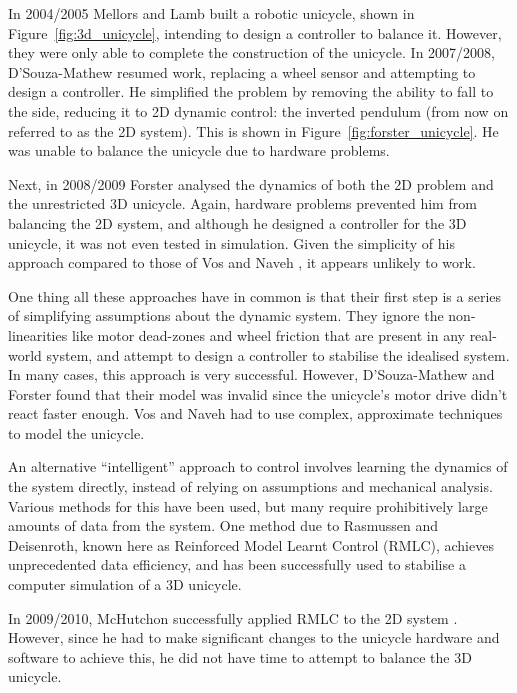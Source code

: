 \documentclass{IIBproject}
\begin{document}
In 2004/2005 Mellors and Lamb \cite{ref:mellors,ref:lamb} built a robotic
unicycle, shown in Figure~\ref{fig:3d_unicycle}, intending to design a controller to balance it. However, they were
only able to complete the construction of the unicycle. In 2007/2008,
D'Souza-Mathew resumed work, replacing a wheel sensor and attempting to design
a controller. He simplified the problem by removing the ability to fall to the
side, reducing it to 2D dynamic control: the inverted pendulum (from
now on referred to as the 2D system). This is shown in
Figure~\ref{fig:forster_unicycle}. He was unable to balance the unicycle due to
hardware problems.

Next, in 2008/2009 Forster analysed the dynamics of both the 2D problem and
the unrestricted 3D unicycle\cite{ref:forster}. Again, hardware problems
prevented him from balancing the 2D system, and although he designed a
controller for the 3D unicycle, it was not even tested in simulation. Given
the simplicity of his approach compared to those of Vos and Naveh
\cite{ref:vos,ref:naveh}, it appears unlikely to work.

One thing all these approaches have in common is that their first step is a
series of simplifying assumptions about the dynamic system. They ignore the
non-linearities like motor dead-zones and wheel friction that are present in
any real-world system, and attempt to design a controller to stabilise the
idealised system. In many cases, this approach is very successful. However,
D'Souza-Mathew and Forster found that their model was invalid since the
unicycle's motor drive didn't react faster enough. Vos and Naveh had to use
complex, approximate techniques to model the unicycle.

An alternative ``intelligent'' approach to control involves learning the
dynamics of the system directly, instead of relying on assumptions and
mechanical analysis. Various methods for this have been used, but many require
prohibitively large amounts of data from the system. One method due to
Rasmussen and Deisenroth, known here as Reinforced Model Learnt Control
(RMLC), achieves unprecedented data efficiency, and has been successfully used
to stabilise a computer simulation of a 3D
unicycle\cite{ref:rasdei08,ref:rasdei11}.

In 2009/2010, McHutchon successfully applied RMLC to the 2D system
\cite{ref:mchutchon}. However, since he had to make significant changes to the
unicycle hardware and software to achieve this, he did not have time to
attempt to balance the 3D unicycle.
\end{document}
